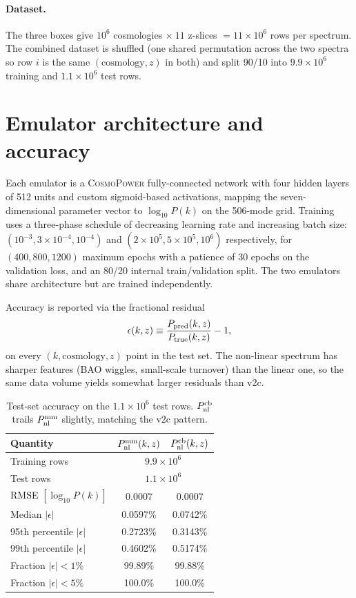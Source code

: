 \documentclass[11pt]{article}
\begin{document}
\paragraph{Dataset.} The three boxes give $10^6$ cosmologies
$\times\ 11$ z-slices $= 11 \times 10^6$ rows per spectrum. The combined
dataset is shuffled (one shared permutation across the two spectra so
row $i$ is the same $(\text{cosmology}, z)$ in both) and split 90/10 into
$9.9 \times 10^6$ training and $1.1 \times 10^6$ test rows.

\section{Emulator architecture and accuracy}
\label{sec:results}

Each emulator is a \textsc{CosmoPower} fully-connected network with four
hidden layers of 512 units and custom sigmoid-based activations,
mapping the seven-dimensional parameter vector to $\log_{10} P(k)$ on
the 506-mode grid. Training uses a three-phase schedule of decreasing
learning rate and increasing batch size:
$(10^{-3}, 3\times10^{-4}, 10^{-4})$ and
$(2\times10^{5}, 5\times10^{5}, 10^{6})$ respectively, for
$(400, 800, 1200)$ maximum epochs with a patience of 30 epochs on the
validation loss, and an 80/20 internal train/validation split. The two
emulators share architecture but are trained independently.

Accuracy is reported via the fractional residual
\[
  \epsilon(k,z) \equiv \frac{P_{\rm pred}(k,z)}{P_{\rm true}(k,z)} - 1,
\]
on every $(k, \text{cosmology}, z)$ point in the test set. The
non-linear spectrum has sharper features (BAO wiggles, small-scale
turnover) than the linear one, so the same data volume yields
somewhat larger residuals than v2c.

\begin{table}[h]
  \centering
  \begin{tabular}{l c c}
    \toprule
    Quantity                          & $P^{\rm mm}_{\rm nl}(k,z)$ & $P^{\rm cb}_{\rm nl}(k,z)$ \\
    \midrule
    Training rows                     & \multicolumn{2}{c}{$9.9 \times 10^6$} \\
    Test rows                         & \multicolumn{2}{c}{$1.1 \times 10^6$} \\
    RMSE $[\log_{10} P(k)]$           & 0.0007 & 0.0007 \\
    Median $|\epsilon|$               & 0.0597\% & 0.0742\% \\
    95th percentile $|\epsilon|$       & 0.2723\% & 0.3143\% \\
    99th percentile $|\epsilon|$       & 0.4602\% & 0.5174\% \\
    Fraction $|\epsilon| < 1\%$       & 99.89\% & 99.88\% \\
    Fraction $|\epsilon| < 5\%$       & 100.0\% & 100.0\% \\
    \bottomrule
  \end{tabular}
  \caption{Test-set accuracy on the $1.1 \times 10^6$ test rows.
  $P^{\rm cb}_{\rm nl}$ trails $P^{\rm mm}_{\rm nl}$ slightly, matching
  the v2c pattern.}
  \label{tab:metrics}
\end{table}
\end{document}
